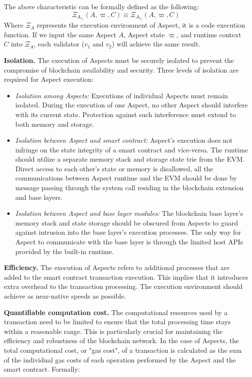 The above characteristic can be formally defined as the following:
\[
\Xi_{A_{v_1}}(A, \varpi, C) \equiv \Xi_{A_{v_2}}(A, \varpi, C)
\]
Where $\Xi_{A}$ represents the execution environment of Aspect, it is a code execution function. If we input the same Aspect $A$, Aspect state $\varpi$, and runtime context $C$ into $\Xi_{A}$, each validator ($v_1$ and $v_2$) will achieve the same result.

\textbf{Isolation.} The execution of Aspects must be securely isolated to prevent the compromise of blockchain availability and security. Three levels of isolation are required for Aspect execution:

\begin{itemize}
  \item \textit{Isolation among Aspects:} Executions of individual Aspects must remain isolated. During the execution of one Aspect, no other Aspect should interfere with its current state. Protection against such interference must extend to both memory and storage.
  \item \textit{Isolation between Aspect and smart contract:} Aspect's execution does not infringe on the state integrity of a smart contract and vice-versa. The runtime should utilize a separate memory stack and storage state trie from the EVM. Direct access to each other's state or memory is disallowed, all the communications between Aspect runtime and the EVM should be done by message passing through the system call residing in the blockchain extension and base layers.
  \item \textit{Isolation between Aspect and base layer modules:} The blockchain base layer's memory stack and state storage should be obscured from Aspects to guard against intrusion into the base layer's execution processes. The only way for Aspect to communicate with the base layer is through the limited host APIs provided by the built-in runtime.
\end{itemize}

\textbf{Efficiency.} The execution of Aspects refers to additional processes that are added to the smart contract transaction execution. This implies that it introduces extra overhead to the transaction processing. The execution environment should achieve as near-native speeds as possible.

\textbf{Quantifiable computation cost.} The computational resources used by a transaction need to be limited to ensure that the total processing time stays within a reasonable range. This is particularly crucial for maintaining the efficiency and robustness of the blockchain network. In the case of Aspects, the total computational cost, or "gas cost", of a transaction is calculated as the sum of the individual gas costs of each operation performed by the Aspect and the smart contract. Formally:

